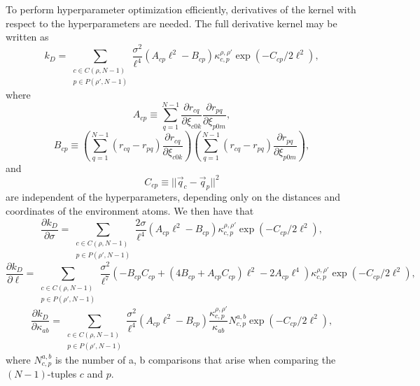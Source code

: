 \documentclass[%
preprint,
amsmath,amssymb,
aps,
]{revtex4-1}
\begin{document}
To perform hyperparameter optimization efficiently, derivatives of the kernel with respect to the hyperparameters are needed. The full derivative kernel may be written as
\begin{equation}
k_D = \sum\limits_{\substack{c \in C(\rho, N-1) \\ p \in P(\rho', N-1)}} \frac{\sigma^2}{\ell^4} (A_{cp} \ell^2 - B_{cp})\kappa_{c,p}^{\rho, \rho'} \exp(-C_{cp} / 2 \ell^2),
\end{equation}
where
\begin{equation}
A_{cp} \equiv \sum_{q=1}^{N-1} \frac{\partial r_{cq}}{\partial \xi_{c0k}} \frac{\partial r_{pq}}{\partial \xi_{p0m}},
\end{equation}
\begin{equation}
B_{cp} \equiv \left( \sum_{q=1}^{N-1} (r_{cq} - r_{pq}) \frac{\partial r_{cq}}{\partial \xi_{c0k}} \right)\left( \sum_{q=1}^{N-1} (r_{cq} - r_{pq}) \frac{\partial r_{pq}}{\partial \xi_{p0m}} \right),
\end{equation}
and
\begin{equation}
   C_{cp} \equiv ||\vec{q}_c - \vec{q}_p||^2
\end{equation}
are independent of the hyperparameters, depending only on the distances and coordinates of the environment atoms. We then have that
\begin{equation}
\frac{\partial k_D}{\partial \sigma} = \sum\limits_{\substack{c \in C(\rho, N-1) \\ p \in P(\rho', N-1)}} \frac{2 \sigma}{\ell^4} (A_{cp} \ell^2 - B_{cp})\kappa_{c,p}^{\rho, \rho'} \exp(-C_{cp} / 2 \ell^2),
\end{equation}
\begin{equation}
\frac{\partial k_D}{\partial \ell} = \sum\limits_{\substack{c \in C(\rho, N-1) \\ p \in P(\rho', N-1)}} \frac{\sigma^2}{\ell^7} (-B_{cp} C_{cp} + (4 B_{cp} + A_{cp} C_{cp}) \ell^2 - 2 A_{cp} \ell^4)\kappa_{c,p}^{\rho, \rho'} \exp(-C_{cp} / 2 \ell^2),
\end{equation}
\begin{equation}
\frac{\partial k_D}{\partial \kappa_{ab}} = \sum\limits_{\substack{c \in C(\rho, N-1) \\ p \in P(\rho', N-1)}} \frac{\sigma^2}{\ell^4} (A_{cp} \ell^2 - B_{cp}) \frac{\kappa_{c,p}^{\rho, \rho'}}{\kappa_{ab}} N_{c,p}^{a,b} \exp(-C_{cp} / 2 \ell^2),
\end{equation}
where $N_{c,p}^{a,b}$ is the number of a, b comparisons that arise when comparing the $(N-1)$-tuples $c$ and $p$.
\end{document}
